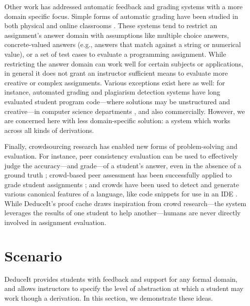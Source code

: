 \documentclass{sigchi}
\begin{document}
Other work has addressed automatic feedback and grading systems with a more domain specific focus. Simple forms of automatic grading have been studied in both physical and online classrooms \cite{auto-grade}. These systems tend to restrict an assignment's answer domain with assumptions like multiple choice answers, concrete-valued answers (e.g., answers that match against a string or numerical value), or a set of test cases to evaluate a programming assignment. While restricting the answer domain can work well for certain subjects or applications, in general it does not grant an instructor sufficient means to evaluate more creative or complex assignments. Various exceptions exist here as well: for instance, automated grading and plagiarism detection systems have long evaluated student program code---where solutions may be unstructured and creative---in computer science departments \cite{grade-programs, moss}, and also commercially. However, we are concerned here with less domain-specific solution: a system which works across all kinds of derivations.

Finally, crowdsourcing research has enabled new forms of problem-solving and evaluation. For instance, peer consistency evaluation can be used to effectively judge the accuracy---and grade---of a student's answer, even in the absence of a ground truth \cite{peer-consistency}; crowd-based peer assessment has been successfully applied to grade student assignments \cite{peer-assessment, chinmay-srk}; and crowds have been used to detect and generate various canonical features of a language, like code snippets for use in an IDE \cite{crowd-snippets}. While DeduceIt's proof cache draws inspiration from crowd research---the system leverages the results of one student to help another---humans are never directly involved in assignment evaluation. %

\section{Scenario}
DeduceIt provides students with feedback and support for any formal domain, and allows instructors to specify the level of abstraction at which a student may work though a derivation. In this section, we demonstrate these ideas. 
\end{document}
